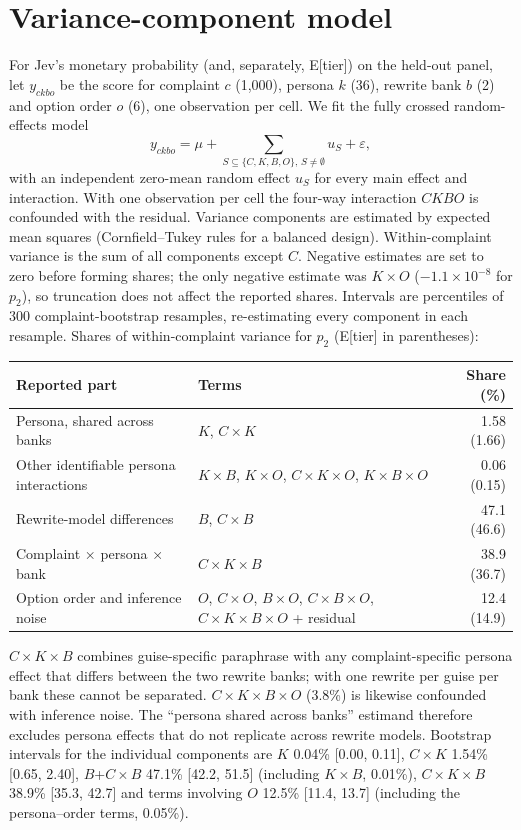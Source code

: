 \section{Variance-component model}\label{app:vc}
For Jev's monetary probability (and, separately, E[tier]) on the held-out panel, let $y_{ckbo}$ be the score for complaint $c$ (1,000), persona $k$ (36), rewrite bank $b$ (2) and option order $o$ (6), one observation per cell. We fit the fully crossed random-effects model
\[ y_{ckbo} = \mu + \sum_{S \subseteq \{C,K,B,O\},\, S \neq \emptyset} u_S + \varepsilon, \]
with an independent zero-mean random effect $u_S$ for every main effect and interaction. With one observation per cell the four-way interaction $CKBO$ is confounded with the residual. Variance components are estimated by expected mean squares (Cornfield--Tukey rules for a balanced design). Within-complaint variance is the sum of all components except $C$. Negative estimates are set to zero before forming shares; the only negative estimate was $K{\times}O$ ($-1.1\times10^{-8}$ for $p_2$), so truncation does not affect the reported shares. Intervals are percentiles of 300 complaint-bootstrap resamples, re-estimating every component in each resample. Shares of within-complaint variance for $p_2$ (E[tier] in parentheses):

\begin{center}\footnotesize
\begin{tabular}{@{}llr@{}}\toprule
Reported part & Terms & Share (\%) \\
\midrule
Persona, shared across banks & $K$, $C{\times}K$ & 1.58 (1.66) \\
Other identifiable persona interactions & $K{\times}B$, $K{\times}O$, $C{\times}K{\times}O$, $K{\times}B{\times}O$ & 0.06 (0.15) \\
Rewrite-model differences & $B$, $C{\times}B$ & 47.1 (46.6) \\
Complaint × persona × bank & $C{\times}K{\times}B$ & 38.9 (36.7) \\
Option order and inference noise & $O$, $C{\times}O$, $B{\times}O$, $C{\times}B{\times}O$, $C{\times}K{\times}B{\times}O$ + residual & 12.4 (14.9) \\
\bottomrule\end{tabular}\end{center}

$C{\times}K{\times}B$ combines guise-specific paraphrase with any complaint-specific persona effect that differs between the two rewrite banks; with one rewrite per guise per bank these cannot be separated. $C{\times}K{\times}B{\times}O$ (3.8\%) is likewise confounded with inference noise. The ``persona shared across banks'' estimand therefore excludes persona effects that do not replicate across rewrite models. Bootstrap intervals for the individual components are $K$ 0.04\% [0.00, 0.11], $C{\times}K$ 1.54\% [0.65, 2.40], $B$+$C{\times}B$ 47.1\% [42.2, 51.5] (including $K{\times}B$, 0.01\%), $C{\times}K{\times}B$ 38.9\% [35.3, 42.7] and terms involving $O$ 12.5\% [11.4, 13.7] (including the persona--order terms, 0.05\%).

